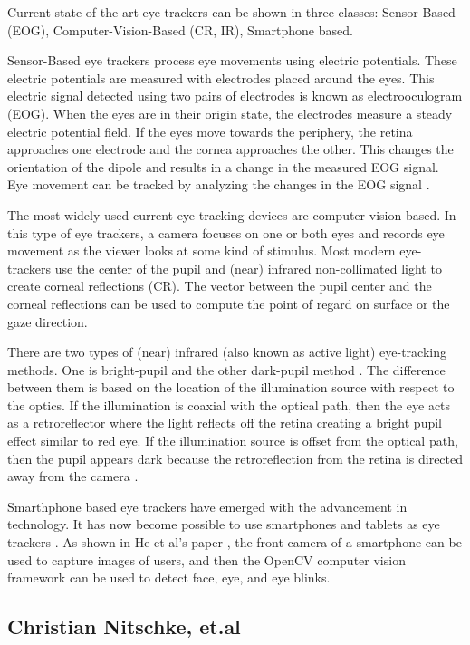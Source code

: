 Current state-of-the-art eye trackers can be shown in three classes: Sensor-Based (EOG), Computer-Vision-Based (CR, IR), Smartphone based.

Sensor-Based eye trackers process eye movements using electric potentials. These electric potentials are measured with electrodes placed around the eyes. This electric signal detected using two pairs of electrodes is known as electrooculogram (EOG). When the eyes are in their origin state, the electrodes measure a steady electric potential field. If the eyes move towards the periphery, the retina approaches one electrode and the cornea approaches the other. This changes the orientation of the dipole and results in a change in the measured EOG signal. Eye movement can be tracked by analyzing the changes in the EOG signal \cite{9}.


The most widely used current eye tracking devices are computer-vision-based. In this type of eye trackers, a camera focuses on one or both eyes and records eye movement as the viewer looks at some kind of stimulus. Most modern eye-trackers use the center of the pupil and (near) infrared non-collimated light to create corneal reflections (CR). The vector between the pupil center and the corneal reflections can be used to compute the point of regard on surface or the gaze direction. 

There are two types of (near) infrared (also known as active light) eye-tracking methods. One is bright-pupil and the other dark-pupil method \cite{10}. The difference between them is based on the location of the illumination source with respect to the optics. If the illumination is coaxial with the optical path, then the eye acts as a retroreflector where the light reflects off the retina creating a bright pupil effect similar to red eye. If the illumination source is offset from the optical path, then the pupil appears dark because the retroreflection from the retina is directed away from the camera \cite{10}.


Smarthphone based eye trackers have emerged with the advancement in technology. It has now become possible to use smartphones and tablets as eye trackers \cite{11}\cite{12}. As shown in He et al's paper \cite{14}, the front camera of a smartphone can be used to capture images of users, and then the OpenCV computer vision framework can be used to detect face, eye, and eye blinks.


\subsection{Christian Nitschke, et.al \cite{20}}

